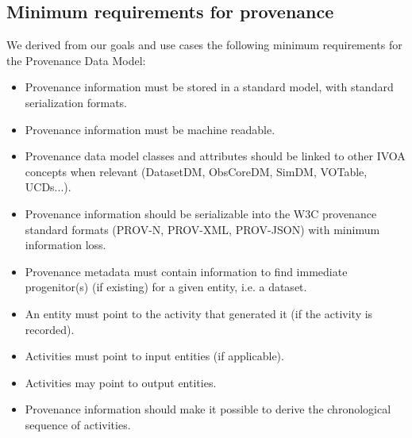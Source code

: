 \subsection{Minimum requirements for provenance}\label{sec:requirements}

We derived from our goals and use cases the following minimum requirements for the Provenance Data Model:

\begin{itemize}


\item Provenance information must be stored in a standard model, with standard serialization formats.

\item Provenance information must be machine readable.

\item Provenance data model classes and attributes should be linked to other IVOA concepts when relevant (DatasetDM, ObsCoreDM, SimDM, VOTable, UCDs...).

\item Provenance information should be serializable into the W3C provenance standard formats (PROV-N, PROV-XML, PROV-JSON) with minimum information loss.



\item Provenance metadata must contain information to find immediate progenitor(s) (if existing) for a given entity, i.e. a dataset.


\item An entity must point to the activity that generated it (if the activity is recorded).

\item Activities must point to input entities (if applicable).

\item Activities may point to output entities.

\item Provenance information should make it possible to derive the chronological sequence of activities.

\end{itemize}

